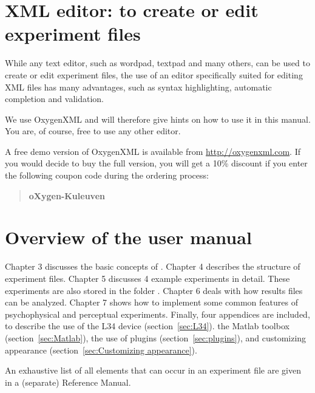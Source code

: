 \section{XML editor: to create or edit experiment files}

While any text editor, such as wordpad, textpad and many others,
can be used to create or edit experiment files, the use of an
editor specifically suited for editing XML files has many
advantages, such as syntax highlighting, automatic completion and
validation.

We use OxygenXML and will therefore give hints on how to use it in
this manual. You are, of course, free to use any other editor.

A free demo version of OxygenXML is available from \url{http://oxygenxml.com}. If you would decide to buy the full version, you will get a 10\% discount if you enter the following coupon code during the ordering process:
\begin{quote}
    \textbf{oXygen-Kuleuven}
\end{quote}
\label{sec:XML editor}

\section{Overview of the \apex user manual}

Chapter 3 discusses the basic concepts of \apex. Chapter 4
describes the structure of experiment files. Chapter 5 discusses 4
example experiments in detail. These experiments are also stored
in the folder . Chapter 6 deals with how
\apex results files can be analyzed. Chapter 7 shows how to
implement some common features of psychophysical and perceptual
experiments. Finally, four appendices are included, to describe
the use of the L34 device (section~\ref{sec:L34}).
 the Matlab toolbox (section~\ref{sec:Matlab}),
the use of plugins (section~\ref{sec:plugins}), and customizing
appearance (section~\ref{sec:Customizing appearance}).

An exhaustive list of all elements that can occur in an \apex
experiment file are given in a (separate) \apex Reference Manual.

